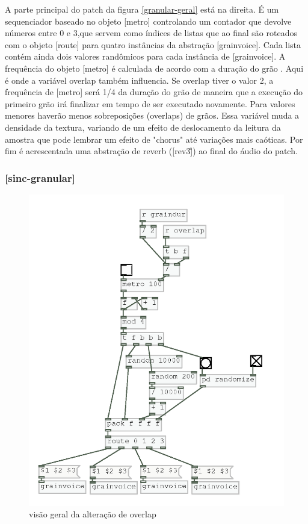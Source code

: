 \documentclass[draft]{ppgmus}
\begin{document}
A parte principal do patch da figura \ref{granular-geral} está na direita. É um sequenciador baseado no objeto
[metro] controlando um contador que devolve números entre 0 e 3,que servem como índices de listas que ao final
são roteados com o objeto [route] para quatro instâncias da abstração [grainvoice]. Cada lista contém ainda dois
valores randômicos para cada instância de [grainvoice]. A frequência do objeto [metro] é calculada de acordo com a duração
do grão . Aqui é onde a variável
overlap também influencia. Se overlap tiver o valor 2, a frequência de [metro] será 1/4 da duração
do grão de maneira que a execução do primeiro grão irá finalizar em tempo de ser executado novamente.
Para valores menores haverão menos sobreposições (overlaps) de grãos. Essa variável muda a densidade da
textura, variando de um efeito de deslocamento da leitura da amostra que pode lembrar um efeito de 
"chorus" até variações mais caóticas. Por fim é acrescentada uma abstração de reverb ([rev3\~]) ao final
do áudio do patch.



\subsubsection{[sinc-granular]}




\begin{figure}
\includegraphics[scale=.6]{sinc-gran1}
\caption{visão geral da alteração de overlap}
\label{sinc-gran1}
\end{figure}
\end{document}
